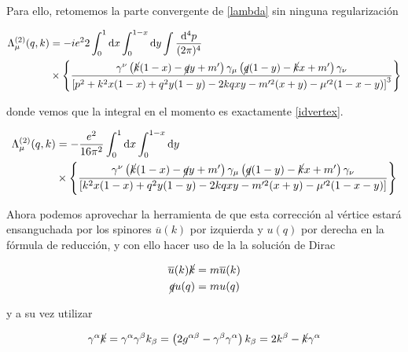 \documentclass[tickz]{article}
\numberwithin{equation}{section}
\begin{document}
Para ello, retomemos la parte convergente de \ref{lambda} sin ninguna regularización

\begin{equation}\label{key}
\begin{aligned}
\Lambda^{(2)}_{\mu}(q,k)&=-ie^22\int_0^1\mathrm{d}x\int_0^{1-x}\mathrm{d}y \int \frac{\mathrm{d^4}p}{(2\pi)^4}\\
& \times \left\{ \frac{  \gamma^{\nu}\left(\cancel{k}(1-x) -\cancel{q}y+m'\right)\gamma_{\mu}\left( \cancel{q}(1-y) -\cancel{k}x +m'\right)\gamma_{\nu}}{\left[p^2 + k^2x(1-x) +q^2y(1-y) -2kqxy -m'^2(x+y) -\mu'^2(1-x-y)\right]^3} \right\}
\end{aligned}
\end{equation}

donde vemos que la integral en el momento es exactamente \ref{idvertex}.


\begin{equation}\label{aux7}
\begin{aligned}
\Lambda^{(2)}_{\mu}(q,k)&=-\frac{e^2}{16 \pi^2}\int_0^1\mathrm{d}x\int_0^{1-x}\mathrm{d}y \\
& \times \left\{ \frac{  \gamma^{\nu}\left(\cancel{k}(1-x) -\cancel{q}y+m'\right)\gamma_{\mu}\left( \cancel{q}(1-y) -\cancel{k}x +m'\right)\gamma_{\nu}}{\left[k^2x(1-x) +q^2y(1-y) -2kqxy -m'^2(x+y) -\mu'^2(1-x-y)\right]} \right\}\\
\end{aligned}
\end{equation}

Ahora podemos aprovechar la herramienta de que esta corrección al vértice estará ensanguchada por los spinores $ \overline{u}(k) $ por izquierda y $ u(q) $ por derecha en la fórmula de reducción, y con ello hacer uso de la la solución de Dirac

\begin{equation}\label{key}
\begin{aligned}
\overline{u}(k) \cancel{k}&=m\overline{u}(k)\\
\cancel{q} u(q)&= m u(q)
\end{aligned}
\end{equation}  

y a su vez utilizar

\begin{equation}\label{key}
\gamma^{\alpha}\cancel{k}=\gamma^{\alpha}\gamma^{\beta} k_{\beta} = \left( 2g^{\alpha\beta} - \gamma^{\beta}\gamma^{\alpha}\right)k_{\beta}= 2k^{\beta} - \cancel{k}\gamma^{\alpha}
\end{equation}
\end{document}
